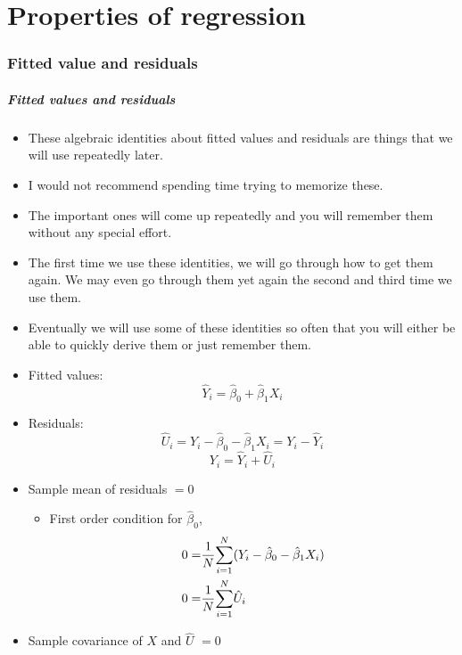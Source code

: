 \part{Properties of regression}

\frame{\partpage}
\begin{frame}
  \tableofcontents  
\end{frame}

\section{Fitted value and residuals}

\begin{frame}[allowframebreaks]
  \frametitle{Fitted values and residuals}
  \begin{itemize}
  \item These algebraic identities about fitted values and residuals are
things that we will use repeatedly later. 
\item I would not recommend spending time trying to memorize these. 
\item The important ones will come
up repeatedly and you will remember them without any special
effort. 
\item The first time we use these identities, we will go through how
to get them again. We may even go through them yet again the second
and third time we use them. 
\item Eventually we will use some of these
identities so often that you will either be able to quickly derive
them or just remember them.
 \item \alert{Fitted values}: 
    \[ \hat{Y}_i = \hat{\beta}_0 +
    \hat{\beta}_1 X_i \]
  \item \alert{Residuals}: 
    \[\hat{U}_i = Y_i - \hat{\beta}_0 -
    \hat{\beta}_1 X_i = Y_i  - \hat{Y}_i \] 
    \[ Y_i = \hat{Y}_i + \hat{U}_i \]
  \item Sample mean of residuals $=0$
    \begin{itemize}
    \item First order condition for $\hat{\beta}_0$,
      \begin{align*}
        0 = &\frac{1}{N} \underset{i=1}{\overset{N}{\sum}} (Y_i - \hat{\beta}_0 - \hat{\beta}_1
        X_i) \\ 
        0 = & \frac{1}{N} \underset{i=1}{\overset{N}{\sum}} \hat{U}_i 
      \end{align*}
    \end{itemize}
  \item Sample covariance of $X$ and $\hat{U}$ $= 0$
    \begin{itemize}

\end{itemize}
\end{itemize}
\end{frame}
